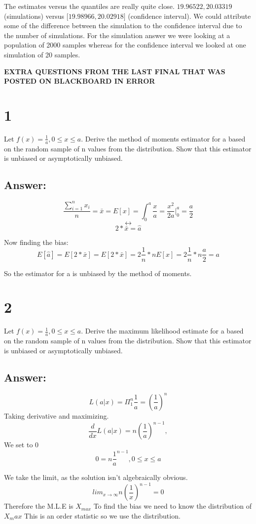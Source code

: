 \documentclass[svgnames]{article}
\begin{document}
The estimates versus the quantiles are really quite close. $19.96522, 20.03319$ (simulations) versus $\Big[19.98966,20.02918\Big]$ (confidence interval). We could attribute some of the difference between the simulation to the confidence interval due to the number of simulations. For the simulation answer we were looking at a population of 2000 samples whereas for the confidence interval we looked at one simulation of 20 samples. 


\textbf{EXTRA QUESTIONS FROM THE LAST FINAL THAT WAS POSTED ON BLACKBOARD IN ERROR}

\section*{1}
Let $f(x)=\frac{1}{a}, 0\leq x \leq a$. Derive the method of moments estimator for a based on the random sample of n values from the distribution. Show that this estimator is unbiased or asymptotically unbiased.
\subsection*{Answer:}
$$\frac{\sum_{i=1}^{n} x_i}{n}=\bar{x}=E[x]=\int_{0}^{a}\frac{x}{a}=\frac{x^2}{2a} \Big|^{a}_{0}=\frac{a}{2}$$
$$\leftrightarrow$$
$$2*\bar{x}=\hat{a}$$

Now finding the bias:
$$E[\hat{a}]=E[2*\bar{x}]=E[2*\bar{x}]=2\frac{1}{n}*nE[x]= 2\frac{1}{n}*n\frac{a}{2}= a$$

So the estimator for a is unbiased by the method of moments. 

\section*{2}
Let $f(x)=\frac{1}{a}, 0\leq x \leq a$. Derive the maximum likelihood estimate for a based on the random sample of n values from the distribution. Show that this estimator is unbiased or asymptotically unbiased.
\subsection*{Answer:}

$$L(a|x)=\Pi^{n}_{1}\frac{1}{a}=(\frac{1}{a})^n$$
Taking derivative and maximizing.
$$\frac{d}{dx}L(a|x)=n(\frac{1}{a})^{n-1}, $$
We set to 0
$$0=n{\frac{1}{a}}^{n-1},  0\leq x \leq a$$

We take the limit, as the solution isn't algebraically obvious. 
$$lim_{x\rightarrow \infty}n(\frac{1}{x})^{n-1}=0$$
Therefore the M.L.E is $X_{max}$
To find the bias we need to know the distribution of $X_max$ This is an order statistic so we use the distribution.
\end{document}
